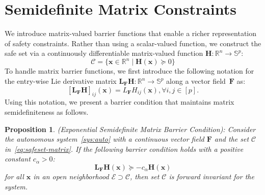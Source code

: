 \documentclass[10pt,a4paper]{amsart}
\newcommand{\real}{\mathbb{R}}
\newcommand{\until}[1]{[#1]}
\newcommand{\map}[3]{#1:#2 \rightarrow #3}
\newcommand{\longthmtitle}[1]{\mbox{}{\textit{(#1):}}}
\newcommand{\setdefb}[2]{\big\{#1 \; | \; #2\big\}}
\newcommand{\Cc}{\mathcal{C}}
\newcommand{\Ec}{\mathcal{E}}
\newtheorem{proposition}{Proposition}
\theoremstyle{definition}
\newcommand{\bx}{\mathbf{x}}
\newcommand{\bF}{\mathbf{F}}
\newcommand{\bH}{\mathbf{H}}
\newcommand{\bL}{\mathbf{L}}
\begin{document}
\section{Semidefinite Matrix Constraints}
\label{sec:EMCBF}
We introduce matrix-valued barrier functions that enable a richer representation of safety constraints. Rather than using a scalar-valued function, we construct the safe set via a continuously differentiable matrix-valued function $\map{\bH}{\real^n}{\mathbb S^p}$:
\begin{equation}
    \label{eq:safeset-matrix}
    \Cc = \setdefb{\bx\in\real^n}{\bH(\bx)\succeq 0}
\end{equation}
To handle matrix barrier functions, we first introduce the following notation for the entry-wise Lie derivative matrix $\map{\bL_\bF\bH}{\real^n}{\mathbb S^p}$ along a vector field~$\bF$ as:
$$
    [\bL_\bF\bH]_{ij}(\bx) = L_\bF H_{ij}(\bx), \forall i,j\in\until{p}.
$$
Using this notation, we present a barrier condition that maintains matrix semidefiniteness as follows.
\begin{proposition}\longthmtitle{Exponential Semidefinite Matrix Barrier Condition}
    \label{prop:BC-matrix}
    Consider the autonomous system~\eqref{sys:auto} with a continuous vector field $\bF$ and the set $\Cc$ in~\eqref{eq:safeset-matrix}. If the following barrier condition holds with a positive constant $c_\alpha>0$:
    \begin{equation}
        \label{eq:BC-matrix}
        \bL_\bF\bH(\bx) \succeq -c_\alpha\bH(\bx)
    \end{equation}
    for all $\bx$ in an open neighborhood $\Ec\supset\Cc$, then set $\Cc$ is forward invariant for the system.
\end{proposition}
\end{document}

